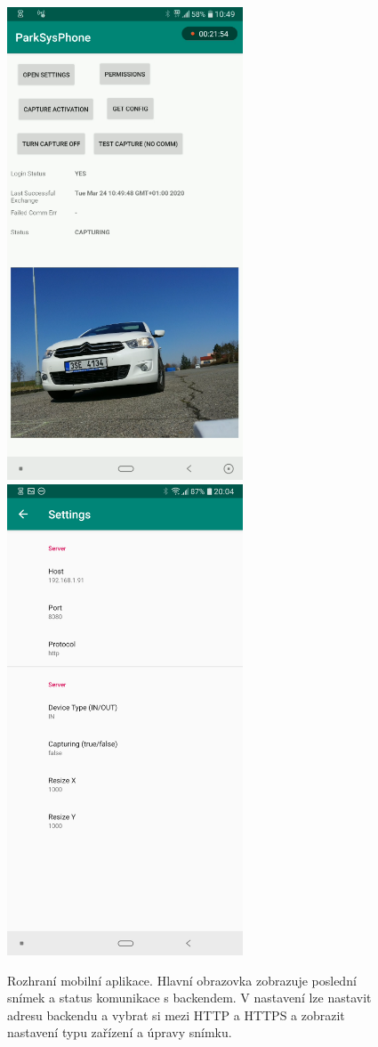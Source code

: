 \begin{figure}[!htb] \centering
  \includegraphics[width=70mm]{../img/app_mainscreen.png}
  \includegraphics[width=70mm]{../img/app_settings.png}
  \caption[Rozhraní mobilní aplikace.]{
    Rozhraní mobilní aplikace.
    Hlavní obrazovka zobrazuje poslední snímek a status komunikace s backendem.
    V nastavení lze nastavit adresu backendu a vybrat si mezi HTTP a HTTPS a
    zobrazit nastavení typu zařízení a úpravy snímku.}
  \label{fig:app_ui}
\end{figure}

